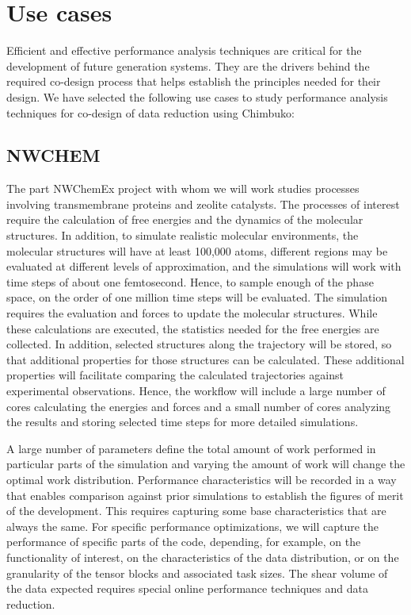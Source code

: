 \section{Use cases}
Efficient and effective performance analysis techniques are critical for the development of future generation systems. They are the drivers behind the required co-design process that helps establish the principles needed for their design. We have selected the following use cases to study performance analysis techniques for co-design of data reduction using Chimbuko:

\subsection{NWCHEM}
The part NWChemEx project with whom we will work studies processes involving transmembrane proteins and zeolite catalysts. The processes of interest require the calculation of free energies and the dynamics of the molecular structures. In addition, to simulate realistic molecular environments, the molecular structures will have at least 100,000 atoms, different regions may be evaluated at different levels of approximation, and the simulations will work with time steps of about one femtosecond.  Hence, to sample enough of the phase space, on the order of one million time steps will be evaluated. The simulation requires the evaluation and forces to update the molecular structures. While these calculations are executed, the statistics needed for the free energies are collected. In addition, selected structures along the trajectory will be stored, so that additional properties for those structures can be calculated. These additional properties will facilitate comparing the calculated trajectories against experimental observations.  Hence, the workflow will include a large number of cores calculating the energies and forces and a small number of cores analyzing the results and storing selected time steps for more detailed simulations. 

A large number of parameters define the total amount of work performed in particular parts of the simulation and varying the amount of work will change the optimal work distribution. Performance characteristics will be recorded in a way that enables comparison against prior simulations to establish the figures of merit of the development. This requires capturing some base characteristics that are always the same. 
For specific performance optimizations, we will capture the performance of specific parts of the code, depending, for example, on the functionality of interest, on the characteristics of the data distribution, or on the granularity of the tensor blocks and associated task sizes. 
The shear volume of the data expected requires special online performance techniques and data reduction.

